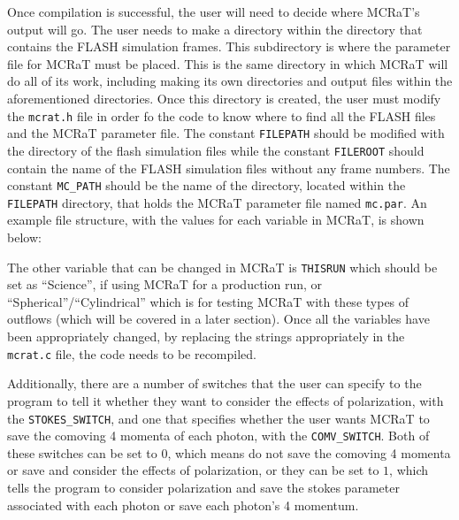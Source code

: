 \documentclass[12pt,a4paper]{article}
\begin{document}
Once compilation is successful, the user will need to decide where MCRaT's output will go. The user needs to make a directory within the directory that contains the FLASH simulation frames. This subdirectory is where the parameter file for MCRaT must be placed. This is the same directory in which MCRaT will do all of its work, including making its own directories and output files within the aforementioned directories. Once this directory is created, the user must modify the \texttt{mcrat.h} file in order fo the code to know where to find all the FLASH files and the MCRaT parameter file. The constant \texttt{FILEPATH} should be modified with the directory of the flash simulation files while the constant \texttt{FILEROOT} should contain the name of the FLASH simulation files without any frame numbers. The constant \texttt{MC\_PATH} should be the name of the directory, located within the \texttt{FILEPATH} directory, that holds the MCRaT parameter file named \texttt{mc.par}. An example file structure, with the values for each variable in MCRaT, is shown below: \\
\begin{figure}[h!]
\end{figure}

The other variable that can be changed in MCRaT is \texttt{THISRUN} which should be set as ``Science'', if using MCRaT for a production run, or ``Spherical''/``Cylindrical'' which is for testing MCRaT with these types of outflows (which will be covered in a later section). Once all the variables have been appropriately changed, by replacing the strings appropriately in the \texttt{mcrat.c} file, the code needs to be recompiled.

Additionally, there are a number of switches that the user can specify to the program to tell it whether they want to consider the effects of polarization, with the \texttt{STOKES\_SWITCH}, and one that specifies whether the user wants MCRaT to save the comoving 4 momenta of each photon, with the \texttt{COMV\_SWITCH}. Both of these switches can be set to $0$, which means do not save the comoving 4 momenta or save and consider the effects of polarization, or they can be set to $1$, which tells the program to consider polarization and save the stokes parameter associated with each photon or save each photon's 4 momentum.
\end{document}
